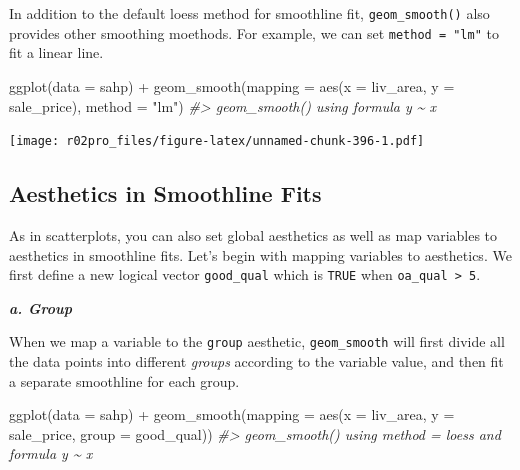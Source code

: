 \documentclass[
]{book}
\newenvironment{Shaded}{\begin{snugshade}}{\end{snugshade}}
\newcommand{\AttributeTok}[1]{\textcolor[rgb]{0.77,0.63,0.00}{#1}}
\newcommand{\CommentTok}[1]{\textcolor[rgb]{0.56,0.35,0.01}{\textit{#1}}}
\newcommand{\DecValTok}[1]{\textcolor[rgb]{0.00,0.00,0.81}{#1}}
\newcommand{\FunctionTok}[1]{\textcolor[rgb]{0.00,0.00,0.00}{#1}}
\newcommand{\NormalTok}[1]{#1}
\newcommand{\OtherTok}[1]{\textcolor[rgb]{0.56,0.35,0.01}{#1}}
\newcommand{\SpecialCharTok}[1]{\textcolor[rgb]{0.00,0.00,0.00}{#1}}
\newcommand{\StringTok}[1]{\textcolor[rgb]{0.31,0.60,0.02}{#1}}
\begin{document}
In addition to the default loess method for smoothline fit, \texttt{geom\_smooth()} also provides other smoothing moethods. For example, we can set \texttt{method\ =\ "lm"} to fit a linear line.

\begin{Shaded}
\begin{Highlighting}[]
\FunctionTok{ggplot}\NormalTok{(}\AttributeTok{data =}\NormalTok{ sahp) }\SpecialCharTok{+} \FunctionTok{geom\_smooth}\NormalTok{(}\AttributeTok{mapping =} \FunctionTok{aes}\NormalTok{(}\AttributeTok{x =}\NormalTok{ liv\_area, }\AttributeTok{y =}\NormalTok{ sale\_price), }\AttributeTok{method =} \StringTok{"lm"}\NormalTok{)}
\CommentTok{\#\textgreater{} \textasciigrave{}geom\_smooth()\textasciigrave{} using formula \textquotesingle{}y \textasciitilde{} x\textquotesingle{}}
\end{Highlighting}
\end{Shaded}

\texttt{[image: r02pro\_files/figure-latex/unnamed-chunk-396-1.pdf]}

\hypertarget{aesthetics-in-smoothline-fits}{%
\subsection{Aesthetics in Smoothline Fits}\label{aesthetics-in-smoothline-fits}}

As in scatterplots, you can also set global aesthetics as well as map variables to aesthetics in smoothline fits. Let's begin with mapping variables to aesthetics. We first define a new logical vector \texttt{good\_qual} which is \texttt{TRUE} when \texttt{oa\_qual\ \textgreater{}\ 5}.

\begin{Shaded}
\end{Shaded}

\textbf{\emph{a. Group}}

When we map a variable to the \texttt{group} aesthetic, \texttt{geom\_smooth} will first divide all the data points into different \emph{groups} according to the variable value, and then fit a separate smoothline for each group.

\begin{Shaded}
\begin{Highlighting}[]
\FunctionTok{ggplot}\NormalTok{(}\AttributeTok{data =}\NormalTok{ sahp) }\SpecialCharTok{+} \FunctionTok{geom\_smooth}\NormalTok{(}\AttributeTok{mapping =} \FunctionTok{aes}\NormalTok{(}\AttributeTok{x =}\NormalTok{ liv\_area, }\AttributeTok{y =}\NormalTok{ sale\_price, }\AttributeTok{group =}\NormalTok{ good\_qual))}
\CommentTok{\#\textgreater{} \textasciigrave{}geom\_smooth()\textasciigrave{} using method = \textquotesingle{}loess\textquotesingle{} and formula \textquotesingle{}y \textasciitilde{} x\textquotesingle{}}
\end{Highlighting}
\end{Shaded}
\end{document}
